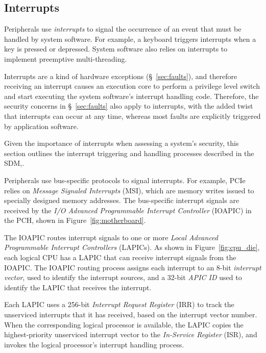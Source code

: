 \subsection{Interrupts}
\label{sec:interrupts}

Peripherals use \textit{interrupts} to signal the occurrence of an event that
must be handled by system software. For example, a keyboard triggers interrupts
when a key is pressed or depressed. System software also relies on interrupts
to implement preemptive multi-threading.

Interrupts are a kind of hardware exceptions (\S~\ref{sec:faults}), and
therefore receiving an interrupt causes an execution core to perform a
privilege level switch and start executing the system software's interrupt
handling code. Therefore, the security concerns in \S~\ref{sec:faults} also
apply to interrupts, with the added twist that interrupts can occur at any
time, whereas most faults are explicitly triggered by application software.

Given the importance of interrupts when assessing a system's security, this
section outlines the interrupt triggering and handling processes described
in the SDM,.


Peripherals use bus-specific protocols to signal interrupts. For example, PCIe
relies on \textit{Message Signaled Interrupts} (MSI), which are memory writes
issued to specially designed memory addresses. The bus-specific interrupt
signals are received by the \textit{I/O Advanced Programmable Interrupt
Controller} (IOAPIC) in the PCH, shown in Figure~\ref{fig:motherboard}.


The IOAPIC routes interrupt signals to one or more \textit{Local Advanced
Programmable Interrupt Controllers} (LAPICs). As shown in
Figure~\ref{fig:cpu_die}, each logical CPU has a LAPIC that can receive
interrupt signals from the IOAPIC. The IOAPIC routing process assigns each
interrupt to an 8-bit \textit{interrupt vector}, used to identify the interrupt
sources, and a 32-bit \textit{APIC ID} used to identify the LAPIC that receives
the interrupt.


Each LAPIC uses a 256-bit \textit{Interrupt Request Register} (IRR) to track
the unserviced interrupts that it has received, based on the interrupt vector
number. When the corresponding logical processor is available, the LAPIC copies
the highest-priority unserviced interrupt vector to the
\textit{In-Service Register} (ISR), and invokes the logical processor's
interrupt handling process.

